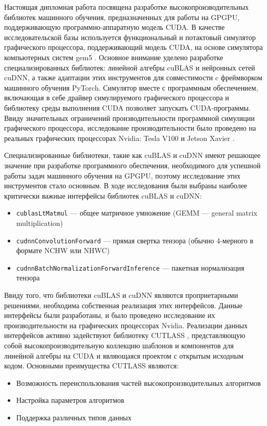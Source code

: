 Настоящая дипломная работа посвящена разработке высокопроизводительных библиотек машинного обучения, предназначенных для работы на GPGPU, поддерживающую
программно-аппаратную модель CUDA. В качестве исследовательской базы используется функциональный и потактовый симулятор графического процессора,
поддерживающий модель CUDA, на основе симулятора компьютерных систем gem5 \cite{gem5_2025}. Основное внимание уделено разработке специализированных библиотек:
линейной алгебры cuBLAS и нейронных сетей cuDNN, а также адаптации этих инструментов для совместимости c фреймворком машинного обучения PyTorch.
Симулятор вместе с программным обеспечением, включающая в себе драйвер симулируемого графического процессора и библиотеку среды выполнения CUDA позволяет
запускать CUDA-программы. Ввиду значительных ограничений производительности программной симуляции графического процессора, исследование
производительности было проведено на реальных графических процессорах Nvidia: Tesla V100 \cite{tesla_v100_2025} и Jetson Xavier \cite{jetson_xavier_2025}.

Специализированные библиотеки, такие как cuBLAS и cuDNN имеют решающее значение при разработке программного обеспечения, необходимого для успешной
работы задач машинного обучения на GPGPU, поэтому исследование этих инструментов стало основным. В ходе исследования были выбраны наиболее критически
важные интерфейсы библиотек cuBLAS и cuDNN:
\begin{itemize}
    \item \texttt{cublasLtMatmul} — общее матричное умножение (GEMM — general matrix multiplic\-ation)
    \item \texttt{cudnnConvolutionForward} — прямая свертка тензора (обычно 4-мерного в формате NCHW или NHWC)
    \item \texttt{cudnnBatchNormalizationForwardInference} — пакетная нормализация тензора
\end{itemize}
Ввиду того, что библиотеки cuBLAS и cuDNN являются проприетарными решениями, необходима собственная реализация этих интерфейсов.
Данные интерфейсы были разработаны, и было проведено исследование их производительности на графических процессорах Nvidia. Реализации данных интерфейсов
активно задействуют библиотеку CUTLASS \cite{cutlass_2025}, представляющую собой высокопроизводительную коллекцию шаблонов и компонентов для линейной алгебры
на CUDA и являющаяся проектом с открытым исходным кодом. Основными преимущества CUTLASS являются:
\begin{itemize}
    \item Возможность переиспользования частей высокопроизводительных алгоритмов
    \item Настройка параметров алгоритмов
    \item Поддержка различных типов данных
\end{itemize}

